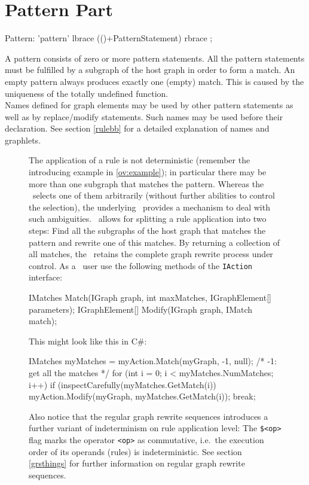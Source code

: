 \section{Pattern Part}
\label{patternpart}
\begin{rail}
  Pattern: 'pattern' lbrace (()+PatternStatement) rbrace ;
\end{rail}
A pattern consists of zero or more pattern statements. 
All the pattern statements must be fulfilled by a subgraph of the host graph in order to form a match. 
An empty pattern always produces exactly one (empty) match. 
This is caused by the uniqueness of the totally undefined function.\\
Names defined for graph elements may be used by other pattern statements as well as by replace/modify statements. 
Such names may be used before their declaration. 
See section \ref{rulebb} for a detailed explanation of names and graphlets.
\begin{figure}[htbp]
\begin{note}
The application of a rule is not deterministic (remember the introducing example in \ref{ov:example}); in particular there may be more than one subgraph that matches the pattern. 
Whereas the \GrShell\ selects one of them arbitrarily (without further abilities to control the selection), the underlying \LibGr\ provides a mechanism to deal with such ambiguities. 
\LibGr\ allows for splitting a rule application into two steps: Find all the subgraphs of the host graph that matches the pattern and rewrite one of this matches. 
By returning a collection of all matches, the \LibGr\ retains the complete graph rewrite process under control.
As a \LibGr\ user use the following methods of the \texttt{IAction} interface:
\begin{csharplet}
IMatches Match(IGraph graph, int maxMatches, IGraphElement[] parameters);
IGraphElement[] Modify(IGraph graph, IMatch match);
\end{csharplet}
This might look like this in C\#:
\begin{csharplet}
IMatches myMatches = myAction.Match(myGraph, -1, null); /* -1: get all the matches */
for (int i = 0;  i < myMatches.NumMatches; i++)
{
	if (inspectCarefully(myMatches.GetMatch(i))
	{
		myAction.Modify(myGraph, myMatches.GetMatch(i));
		break;
  	}
}
\end{csharplet}

Also notice that the regular graph rewrite sequences introduces a further variant of indeterminism on rule application level: 
The \texttt{\$<op>} flag marks the operator \texttt{<op>} as commutative, i.e.\ the execution order of its operands (rules) is indeterministic. 
See section \ref{grsthings} for further information on regular graph rewrite sequences.
\end{note}
\end{figure}


